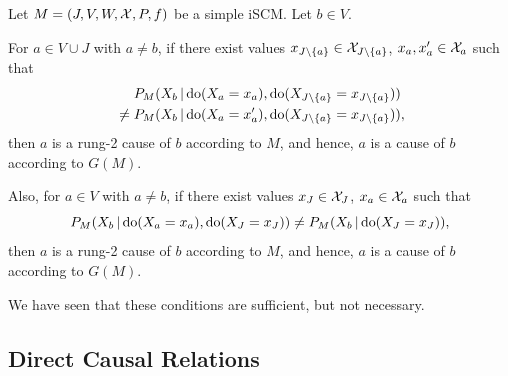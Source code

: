 \begin{Cor}\label{cor:scm_identify_graphical_causal_relation}
  Let $M = \left ( J, V, W, \mathcal{X}, P, f \right )$ be a simple iSCM.
  Let $b \in V$.

  For $a \in V \cup J$ with $a \ne b$, if there exist values $x_{J\setminus\{a\}} \in \mathcal{X}_{J\setminus\{a\}}$, $x_a,x_a' \in \mathcal{X}_a$ such that
    \begin{equation*}\begin{split}
      & P_{M}(X_b \operatorname*{|} \operatorname{do}(X_a=x_a),\operatorname{do}(X_{J\setminus \{a\}}=x_{J\setminus \{a\}})) \\
      {} \ne {} & P_{M}(X_b \operatorname*{|} \operatorname{do}(X_a=x_a'),\operatorname{do}(X_{J\setminus\{a\}}=x_{J\setminus\{a\}})),
    \end{split}\end{equation*}
  then $a$ is a rung-2 cause of $b$ according to $M$, and hence, $a$ is a cause of $b$ according to $G(M)$. %

  Also, for $a \in V$ with $a \ne b$, if there exist values $x_J \in \mathcal{X}_J$, $x_a \in \mathcal{X}_a$ such that
  $$P_{M}(X_b \operatorname*{|} \operatorname{do}(X_a=x_a),\operatorname{do}(X_J=x_J)) \ne P_{M}(X_b \operatorname*{|} \operatorname{do}(X_J=x_J)),$$
  then $a$ is a rung-2 cause of $b$ according to $M$, and hence, $a$ is a cause of $b$ according to $G(M)$.  
\end{Cor}
We have seen that these conditions are sufficient, but not necessary.

\subsection{Direct Causal Relations}

